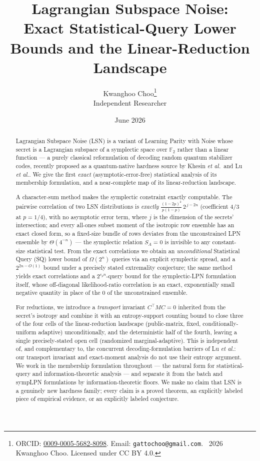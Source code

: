 \documentclass[11pt,a4paper]{article}
\title{Lagrangian Subspace Noise: \\ Exact Statistical-Query Lower Bounds and the Linear-Reduction Landscape}
\author{Kwanghoo Choo\thanks{ORCID: \href{https://orcid.org/0009-0005-5682-8098}{0009-0005-5682-8098}. Email: \texttt{gattochoo@gmail.com}. \textcopyright~2026 Kwanghoo Choo. Licensed under CC BY 4.0.}\\ \normalsize Independent Researcher}
\date{June 2026}
\theoremstyle{plain}
\theoremstyle{definition}
\newcommand{\F}{\mathbb{F}}
\newcommand{\etal}{\textit{et al.}}
\begin{document}
\maketitle

\begin{abstract}
Lagrangian Subspace Noise (LSN) is a variant of Learning Parity with Noise whose secret is a Lagrangian subspace of a symplectic space over $\F_2$ rather than a linear function --- a purely classical reformulation of decoding random quantum stabilizer codes, recently proposed as a quantum-native hardness source by Khesin \etal\ and Lu \etal. We give the first \emph{exact} (asymptotic-error-free) statistical analysis of its membership formulation, and a near-complete map of its linear-reduction landscape.

A character-sum method makes the symplectic constraint exactly computable. The pairwise correlation of two LSN distributions is \emph{exactly} $\tfrac{(1-2p)^2}{p(1-p)}\,2^{\,j-2n}$ (coefficient $4/3$ at $p=1/4$), with no asymptotic error term, where $j$ is the dimension of the secrets' intersection; and every all-ones subset moment of the isotropic row ensemble has an exact closed form, so a fixed-size bundle of rows deviates from the unconstrained LPN ensemble by $\Theta(4^{-n})$ --- the symplectic relation $S_A=0$ is invisible to any constant-size statistical test. From the exact correlations we obtain an \emph{unconditional} Statistical Query (SQ) lower bound of $\Omega(2^n)$ queries via an explicit symplectic spread, and a $2^{2n-O(1)}$ bound under a precisely stated extremality conjecture; the same method yields exact correlations and a $2^{c_p n}$-query bound for the symplectic-LPN formulation itself, whose off-diagonal likelihood-ratio correlation is an exact, exponentially small negative quantity in place of the $0$ of the unconstrained ensemble.

For reductions, we introduce a \emph{transport} invariant $C^{\top}MC=0$ inherited from the secret's isotropy and combine it with an entropy-support counting bound to close three of the four cells of the linear-reduction landscape (public-matrix, fixed, conditionally-uniform adaptive) unconditionally, and the deterministic half of the fourth, leaving a single precisely-stated open cell (randomized marginal-adaptive). This is independent of, and complementary to, the concurrent decoding-formulation barriers of Lu \etal: our transport invariant and exact-moment analysis do not use their entropy argument. We work in the membership formulation throughout --- the natural form for statistical-query and information-theoretic analysis --- and separate it from the batch and sympLPN formulations by information-theoretic floors. We make no claim that LSN is a genuinely new hardness family; every claim is a proved theorem, an explicitly labeled piece of empirical evidence, or an explicitly labeled conjecture.
\end{abstract}
\end{document}
